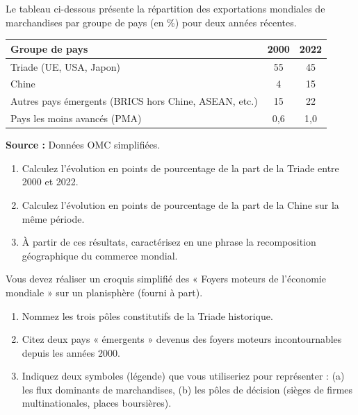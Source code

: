\documentclass[11pt]{article}
\begin{document}
\providecommand{\source}[1]{\par\small\noindent\textbf{Source :} #1\par}
\begin{exercice}
Le tableau ci-dessous présente la répartition des exportations mondiales de marchandises par groupe de pays (en \%) pour deux années récentes.

\begin{tabular}{lcc}
\toprule
\textbf{Groupe de pays} & \textbf{2000} & \textbf{2022} \\
\midrule
Triade (UE, USA, Japon) & 55 & 45 \\
Chine & 4 & 15 \\
Autres pays émergents (BRICS hors Chine, ASEAN, etc.) & 15 & 22 \\
Pays les moins avancés (PMA) & 0,6 & 1,0 \\
\bottomrule
\end{tabular}
\source{Données OMC simplifiées.}
\begin{enumerate}
    \item Calculez l'évolution en points de pourcentage de la part de la Triade entre 2000 et 2022.
    \item Calculez l'évolution en points de pourcentage de la part de la Chine sur la même période.
    \item À partir de ces résultats, caractérisez en une phrase la recomposition géographique du commerce mondial.
\end{enumerate}
\end{exercice}

\begin{exercice}
Vous devez réaliser un croquis simplifié des « Foyers moteurs de l'économie mondiale » sur un planisphère (fourni à part).
\begin{enumerate}
    \item Nommez les trois pôles constitutifs de la Triade historique.
    \item Citez deux pays « émergents » devenus des foyers moteurs incontournables depuis les années 2000.
    \item Indiquez deux symboles (légende) que vous utiliseriez pour représenter : (a) les flux dominants de marchandises, (b) les pôles de décision (sièges de firmes multinationales, places boursières).
\end{enumerate}
\end{exercice}
\end{document}
